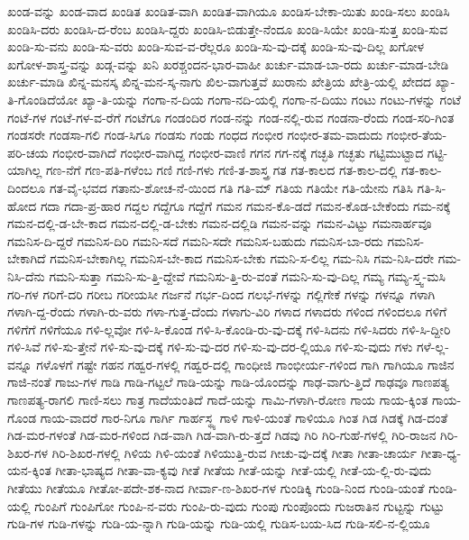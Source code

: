 {ಖಂಡ-ವನ್ನು
ಖಂಡ-ವಾದ
ಖಂಡಿತ
ಖಂಡಿತ-ವಾಗಿ
ಖಂಡಿತ-ವಾಗಿಯೂ
ಖಂಡಿಸ-ಬೇಕಾ-ಯಿತು
ಖಂಡಿ-ಸಲು
ಖಂಡಿಸಿ
ಖಂಡಿಸಿ-ದರು
ಖಂಡಿಸಿ-ದ-ರೆಂಬ
ಖಂಡಿಸಿ-ದ್ದರು
ಖಂಡಿಸಿ-ಬಿಡುತ್ತೇ-ನೆಂದೂ
ಖಂಡಿ-ಸಿಯೇ
ಖಂಡಿ-ಸುತ್ತ
ಖಂಡಿ-ಸುವ
ಖಂಡಿ-ಸು-ವನು
ಖಂಡಿ-ಸು-ವರು
ಖಂಡಿ-ಸುವ-ವ-ರೆಲ್ಲರೂ
ಖಂಡಿ-ಸು-ವು-ದಕ್ಕೆ
ಖಂಡಿ-ಸು-ವು-ದಿಲ್ಲ
ಖಗೋಳ
ಖಗೋಳ-ಶಾಸ್ತ್ರ-ವನ್ನು
ಖಡ್ಗ-ವನ್ನು
ಖನಿ
ಖರಶ್ಚಂದನ-ಭಾರ-ವಾಹೀ
ಖರ್ಚು-ಮಾಡ-ಬಾ-ರದು
ಖರ್ಚು-ಮಾಡ-ಬೇಡಿ
ಖರ್ಚು-ಮಾಡಿ
ಖಿನ್ನ-ಮನಸ್ಕ
ಖಿನ್ನ-ಮನ-ಸ್ಕ-ನಾಗು
ಖಿಲ-ವಾಗುತ್ತವೆ
ಖುರಾನು
ಖೇತ್ರಿಯ
ಖೇತ್ರಿ-ಯಲ್ಲಿ
ಖೇದದ
ಖ್ಯಾ-ತಿ-ಗೊಂಡಿದೆಯೋ
ಖ್ಯಾ-ತಿ-ಯನ್ನು
ಗಂಗಾ-ನ-ದಿಯ
ಗಂಗಾ-ನದಿ-ಯಲ್ಲಿ
ಗಂಗಾ-ನ-ದಿಯು
ಗಂಟು
ಗಂಟು-ಗಳನ್ನು
ಗಂಟೆ
ಗಂಟೆ-ಗಳ
ಗಂಟೆ-ಗಳ-ವ-ರೆಗೆ
ಗಂಟೆಗೂ
ಗಂಡಂದಿರ
ಗಂಡ-ನನ್ನು
ಗಂಡ-ನಲ್ಲಿ-ರುವ
ಗಂಡನಾ-ರೆಂದು
ಗಂಡ-ಸರಿ-ಗಿಂತ
ಗಂಡಸರೇ
ಗಂಡಸಾ-ಗಲಿ
ಗಂಡ-ಸಿಗೂ
ಗಂಡಸು
ಗಂಡು
ಗಂಧದ
ಗಂಭೀರ
ಗಂಭೀರ-ತಮ-ವಾದುದು
ಗಂಭೀರ-ತೆಯ-ಪರಿ-ಚಯ
ಗಂಭೀರ-ವಾಗಿದೆ
ಗಂಭೀರ-ವಾಗಿದ್ದ
ಗಂಭೀರ-ವಾಣಿ
ಗಗನ
ಗಗ-ನಕ್ಕೆ
ಗಚ್ಛತಿ
ಗಚ್ಛತು
ಗಟ್ಟಿಮುಟ್ಟಾದ
ಗಟ್ಟಿ-ಯಾಗಿಲ್ಲ
ಗಣ-ನೆಗೆ
ಗಣ-ಪತಿ-ಗಳೆಂಬ
ಗಣಿ
ಗಣಿ-ಗಳು
ಗಣಿ-ತ-ಶಾಸ್ತ್ರ
ಗತ
ಗತ-ಕಾಲದ
ಗತ-ಕಾಲ-ದಲ್ಲಿ
ಗತ-ಕಾಲ-ದಿಂದಲೂ
ಗತ-ವೈ-ಭವದ
ಗತಾನು-ಶೋಚ-ನೆ-ಯಿಂದ
ಗತಿ
ಗತಿ-ಮ್
ಗತಿಯ
ಗತಿಯೇ
ಗತಿ-ಯೇನು
ಗತಿಸಿ
ಗತಿ-ಸಿ-ಹೋದ
ಗದಾ
ಗದಾ-ಪ್ರ-ಹಾರ
ಗದ್ದಲ
ಗದ್ದೆಗೂ
ಗದ್ದೆಗೆ
ಗಮನ
ಗಮನ-ಕೊ-ಡದೆ
ಗಮನ-ಕೊಡ-ಬೇಕೆಂದು
ಗಮ-ನಕ್ಕೆ
ಗಮನ-ದಲ್ಲಿ-ಡ-ಬೇ-ಕಾದ
ಗಮನ-ದಲ್ಲಿ-ಡ-ಬೇಕು
ಗಮನ-ದಲ್ಲಿಡಿ
ಗಮನ-ವನ್ನು
ಗಮನ-ವಿಟ್ಟು
ಗಮನಾರ್ಹವೂ
ಗಮನಿಸ-ದಿ-ದ್ದರೆ
ಗಮನಿಸ-ದಿರಿ
ಗಮನಿ-ಸದೆ
ಗಮನಿ-ಸದೇ
ಗಮನಿಸ-ಬಹುದು
ಗಮನಿಸ-ಬಾ-ರದು
ಗಮನಿಸ-ಬೇಕಾಗಿದೆ
ಗಮನಿಸ-ಬೇಕಾಗಿಲ್ಲ
ಗಮನಿಸ-ಬೇ-ಕಾದ
ಗಮನಿಸ-ಬೇಕು
ಗಮನಿ-ಸ-ಲಿಲ್ಲ
ಗಮ-ನಿಸಿ
ಗಮ-ನಿಸಿ-ದರೇ
ಗಮ-ನಿಸಿ-ದೆನು
ಗಮನಿ-ಸುತ್ತಾ
ಗಮನಿ-ಸು-ತ್ತಿ-ದ್ದೇವೆ
ಗಮನಿಸು-ತ್ತಿ-ರು-ವಂತೆ
ಗಮನಿ-ಸು-ವು-ದಿಲ್ಲ
ಗಮ್ಯ
ಗಮ್ಯ-ಸ್ತ್ವ-ಮಸಿ
ಗರಿ-ಗಳ
ಗರಿಗೆ-ದರಿ
ಗರೀಬ
ಗರೀಯಸೀ
ಗರ್ಜನೆ
ಗರ್ಭ-ದಿಂದ
ಗಲಭೆ-ಗಳನ್ನು
ಗಲ್ಲಿಗೇಕೆ
ಗಳನ್ನು
ಗಳನ್ನೂ
ಗಳಾಗಿ
ಗಳಾಗಿ-ದ್ದ-ರೆಂದು
ಗಳಾಗಿ-ರು-ವರು
ಗಳಾ-ಗುತ್ತ-ದೆಂದು
ಗಳಾಗು-ವಿರಿ
ಗಳಾದ
ಗಳಾದರು
ಗಳಿಂದ
ಗಳಿಂದಲೂ
ಗಳಿಗೆ
ಗಳಿಗೆಗೆ
ಗಳಿಗೆಯೂ
ಗಳಿ-ಲ್ಲವೋ
ಗಳಿ-ಸಿ-ಕೊಂಡ
ಗಳಿ-ಸಿ-ಕೊಂಡಿ-ರು-ವು-ದಕ್ಕೆ
ಗಳಿ-ಸಿದನು
ಗಳಿ-ಸಿದರು
ಗಳಿ-ಸಿ-ದ್ದೀರಿ
ಗಳಿ-ಸಿವೆ
ಗಳಿ-ಸು-ತ್ತೇನೆ
ಗಳಿ-ಸು-ವು-ದಕ್ಕೆ
ಗಳಿ-ಸು-ವು-ದರ
ಗಳಿ-ಸು-ವು-ದರ-ಲ್ಲಿಯೂ
ಗಳಿ-ಸು-ವುದು
ಗಳು
ಗಳೆ-ಲ್ಲ-ವನ್ನೂ
ಗಳೊಳಗೆ
ಗಷ್ಟೇ
ಗಹನ
ಗಹ್ವರ-ಗಳಲ್ಲಿ
ಗಹ್ವರ-ದಲ್ಲಿ
ಗಾಂಧೀಜಿ
ಗಾಂಭೀರ್ಯ-ಗಳಿಂದ
ಗಾಗಿ
ಗಾಗಿಯೂ
ಗಾಜಿನ
ಗಾಜಿ-ನಂತೆ
ಗಾಜು-ಗಳ
ಗಾಡಿ
ಗಾಡಿ-ಗಟ್ಟಲೆ
ಗಾಡಿ-ಯನ್ನು
ಗಾಡಿ-ಯೊಂದನ್ನು
ಗಾಢ-ವಾಗು-ತ್ತಿದೆ
ಗಾಢವೂ
ಗಾಣಪತ್ಯ
ಗಾಣಪತ್ಯ-ರಾಗಲಿ
ಗಾಣಿ-ಸಲು
ಗಾತ್ರ
ಗಾದೆಯಂತಿದೆ
ಗಾದೆ-ಯನ್ನು
ಗಾಮಿ-ಗಳಾಗಿ-ರೋಣ
ಗಾಯ
ಗಾಯ-ಕ್ಕಿಂತ
ಗಾಯ-ಗೊಂಡ
ಗಾಯ-ವಾದರೆ
ಗಾರ-ನಿಗೂ
ಗಾರ್ಗಿ
ಗಾರ್ಹಸ್ಥ್ಯ
ಗಾಳಿ
ಗಾಳಿ-ಯಂತೆ
ಗಾಳಿಯೂ
ಗಿಂತ
ಗಿಡ
ಗಿಡಕ್ಕೆ
ಗಿಡ-ದಂತೆ
ಗಿಡ-ಮರ-ಗಳಂತೆ
ಗಿಡ-ಮರ-ಗಳಿಂದ
ಗಿಡ-ವಾಗಿ
ಗಿಡ-ವಾಗಿ-ರು-ತ್ತದೆ
ಗಿಡವು
ಗಿರಿ
ಗಿರಿ-ಗುಹೆ-ಗಳಲ್ಲಿ
ಗಿರಿ-ರಾಜನ
ಗಿರಿ-ಶಿಖರ-ಗಳ
ಗಿರಿ-ಶಿಖರ-ಗಳಲ್ಲಿ
ಗಿಳಿಯ
ಗಿಳಿ-ಯಂತೆ
ಗಿಳಿಯುತ್ತಿ-ರುವ
ಗೀಚು-ವು-ದಕ್ಕೆ
ಗೀತಾ
ಗೀತಾ-ಚಾರ್ಯ
ಗೀತಾ-ಧ್ಯ-ಯನ-ಕ್ಕಿಂತ
ಗೀತಾ-ಭಾಷ್ಯದ
ಗೀತಾ-ವಾ-ಕ್ಯವು
ಗೀತೆ
ಗೀತೆಯ
ಗೀತೆ-ಯನ್ನು
ಗೀತೆ-ಯಲ್ಲಿ
ಗೀತೆ-ಯ-ಲ್ಲಿ-ರು-ವುದು
ಗೀತೆಯು
ಗೀತೆಯೂ
ಗೀತೋ-ಪದೇ-ಶಕ-ನಾದ
ಗೀರ್ವಾ-ಣ-ಶಿಖರ-ಗಳ
ಗುಂಡಿಕ್ಕಿ
ಗುಂಡಿ-ನಿಂದ
ಗುಂಡಿ-ಯಂತೆ
ಗುಂಡಿ-ಯಲ್ಲಿ
ಗುಂಪಿಗೆ
ಗುಂಪಿಗೋ
ಗುಂಪಿ-ನ-ವರು
ಗುಂಪಿ-ರು-ವುದು
ಗುಂಪು
ಗುಂಪೊಂದು
ಗುಜರಾತಿನ
ಗುಟ್ಟನ್ನು
ಗುಟ್ಟು
ಗುಡಿ-ಗಳ
ಗುಡಿ-ಗಳನ್ನು
ಗುಡಿ-ಯ-ನ್ನಾಗಿ
ಗುಡಿ-ಯನ್ನು
ಗುಡಿ-ಯಲ್ಲಿ
ಗುಡಿಸ-ಬಯ-ಸಿದ
ಗುಡಿ-ಸಲಿ-ನ-ಲ್ಲಿಯೂ
}
